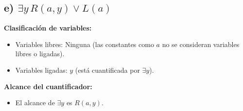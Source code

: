 \documentclass[11pt,letterpaper]{article}
\begin{document}
\subsection*{e) \( \exists y \, R(a, y) \lor L(a) \)}

\textbf{Clasificación de variables:}
\begin{itemize}
    \item Variables libres: Ninguna (las constantes como \( a \) no se consideran variables libres o ligadas).
    \item Variables ligadas: \( y \) (está cuantificada por \( \exists y \)).
\end{itemize}

\textbf{Alcance del cuantificador:}
\begin{itemize}
    \item El alcance de \( \exists y \) es \( R(a, y) \).
\end{itemize}











\end{document}
